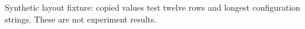 \documentclass[fontsize=11pt,paper=a4,BCOR=5mm,DIV=calc]{scrreprt}
\begin{document}
\noindent Synthetic layout fixture: copied values test twelve rows and longest configuration strings. These are not experiment results.
\begingroup\setlength{\tabcolsep}{3pt}\fontsize{8.5}{10}\selectfont
\def\tiny{\fontsize{5}{5.5}\selectfont}

\endgroup
\end{document}
